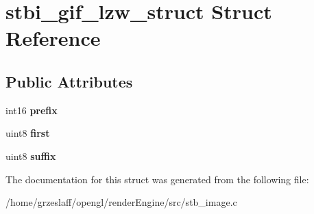 \hypertarget{structstbi__gif__lzw__struct}{\section{stbi\-\_\-gif\-\_\-lzw\-\_\-struct Struct Reference}
\label{structstbi__gif__lzw__struct}
}
\subsection*{Public Attributes}
\begin{DoxyCompactItemize}
\item 
\hypertarget{structstbi__gif__lzw__struct_a0e5142cb4117b905eb9efd73c436525c}{int16 {\bfseries prefix}}\label{structstbi__gif__lzw__struct_a0e5142cb4117b905eb9efd73c436525c}

\item 
\hypertarget{structstbi__gif__lzw__struct_a08129c445d56c0983285d6e0e71b83bd}{uint8 {\bfseries first}}\label{structstbi__gif__lzw__struct_a08129c445d56c0983285d6e0e71b83bd}

\item 
\hypertarget{structstbi__gif__lzw__struct_a3ec7f462268018489345b79b2f123764}{uint8 {\bfseries suffix}}\label{structstbi__gif__lzw__struct_a3ec7f462268018489345b79b2f123764}

\end{DoxyCompactItemize}


The documentation for this struct was generated from the following file\-:\begin{DoxyCompactItemize}
\item 
/home/grzeslaff/opengl/render\-Engine/src/stb\-\_\-image.\-c\end{DoxyCompactItemize}
